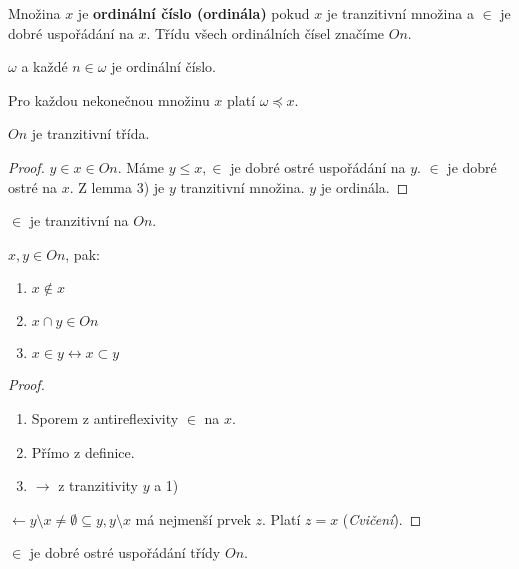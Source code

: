 \begin{definice}
	Množina $x$ je \textbf{ordinální číslo (ordinála)} pokud $x$ je tranzitivní množina a $\in$ je dobré uspořádání na $x$. Třídu všech ordinálních čísel značíme $On$.
\end{definice}

\begin{prikl}
	$\omega$ a každé $n \in \omega$ je ordinální číslo.
\end{prikl}

\begin{dusl}
	Pro každou nekonečnou množinu $x$ platí $\omega \preceq x$.
\end{dusl}

\begin{lemma}
	$On$ je tranzitivní třída.
\end{lemma}

\begin{proof}
	$y \in x \in On$. Máme $y \leq x, \in$ je dobré ostré uspořádání na $y$. $\in$ je dobré ostré na $x$. Z lemma 3) je $y$ tranzitivní množina. $y$ je ordinála.
\end{proof}

\begin{lemma}
	$\in$ je tranzitivní na $On$.
\end{lemma}

\begin{lemma}
	$x,y \in On$, pak:
	
	\begin{enumerate}
		\item $x \notin x$
		\item $x \cap y \in On$
		\item $x \in y \leftrightarrow x \subset y$
	\end{enumerate}
\end{lemma}

\begin{proof}
	\begin{enumerate}
		\item Sporem z antireflexivity $\in$ na $x$.
		\item Přímo z definice.
		\item $\rightarrow$ z tranzitivity $y$ a 1)
	\end{enumerate}
	
	$\leftarrow y \setminus x \neq \emptyset \subseteq y, y \setminus x$ má nejmenší prvek $z$. Platí $z = x$ (\textit{Cvičení}).
\end{proof}

\begin{thm}
	$\in$ je dobré ostré uspořádání třídy $On$.
\end{thm}

